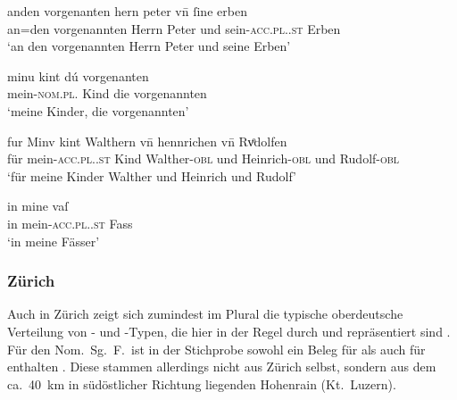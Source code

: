 \begin{exe}
\ex \label{ex:adjbaselregel}
	\begin{xlist}
	\ex \label{ex:adjbaselregel_1}
		\gll anden vorgenanten hern peter vn̄ ſine erben \\
			an=den vorgenannten Herrn Peter und sein-\textsc{acc.pl.\MascM.st}
				Erben \\
		\trans `an den vorgenannten Herrn Peter und seine Erben'
			\parencites(Nr.~1682, Basel, 1293)[16,15--16]{cao3}

	\ex \label{ex:adjbaselregel_2}
		\gll minu kint dú vorgenanten \\
			mein-\textsc{nom.pl.\NeutMF} Kind die vorgenannten \\
		\trans `meine Kinder, die vorgenannten'
			\parencites(Nr.~3184, Rheinfelden, Kt.~Aargau, 1299)[376,13]{cao4}
	\end{xlist}

\ex \label{ex:adjbaselu}
	\begin{xlist}
	\ex \label{ex:adjbaselu_1}
		\gll fur Minv kint Walthern vn̄ hennrichen vn̄ Rvͦdolfen \\
			für mein-\textsc{acc.pl.\NeutM.st} Kind Walther-\textsc{obl} und
			Heinrich-\textsc{obl} und Rudolf-\textsc{obl} \\
		\trans `für meine Kinder Walther und Heinrich und Rudolf'
			\parencites(Nr.~1108, Basel, 1289)[402,36--37]{cao2}

	\ex \label{ex:adjbaselu_2}
		\gll in mine vaſ \\
			in mein-\textsc{acc.pl.\NeutI.st} Fass \\
		\trans `in meine Fässer'
			\parencites(Nr.~N~483, Mulhouse, Dépt.~Haut-Rhin, 1291)[351,23]{cao5}
	\end{xlist}
\end{exe}

\subsubsection{Zürich}
\label{par:adjzuerich}
Auch in Zürich zeigt sich zumindest im Plural die typische
oberdeutsche Verteilung von - und -Typen, die
hier in der Regel durch  und  repräsentiert sind
. Für den Nom.\ Sg.\ F.\ ist in der Stichprobe sowohl ein
Beleg für  als auch für  enthalten . Diese
stammen allerdings nicht aus Zürich selbst, sondern aus dem ca.\ 40~km in
südöstlicher Richtung liegenden Hohenrain (Kt.~Luzern).

